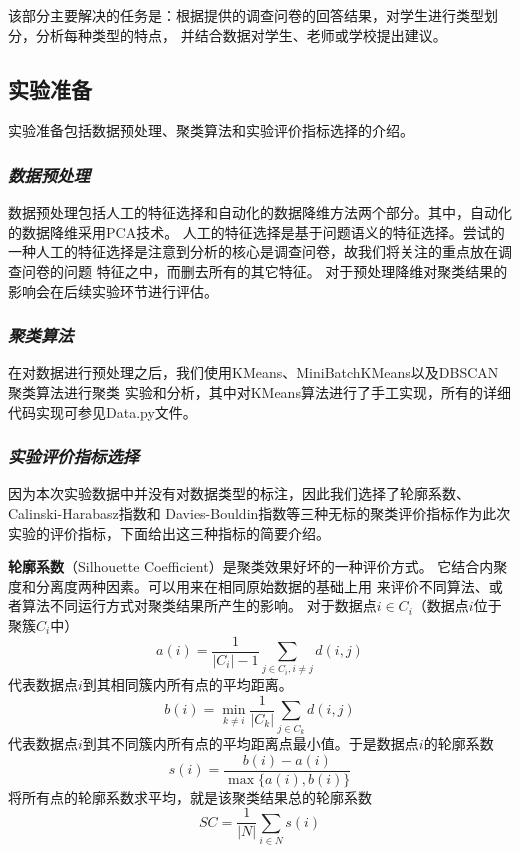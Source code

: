\documentclass{acm_proc_article-sp}
\begin{document}
该部分主要解决的任务是：根据提供的调查问卷的回答结果，对学生进行类型划分，分析每种类型的特点，
并结合数据对学生、老师或学校提出建议。

\subsection{\textsf{实验准备}}
实验准备包括数据预处理、聚类算法和实验评价指标选择的介绍。
\subsubsection{\textit{数据预处理}}

数据预处理包括人工的特征选择和自动化的数据降维方法两个部分。其中，自动化的数据降维采用PCA技术。
人工的特征选择是基于问题语义的特征选择。尝试的一种人工的特征选择是注意到分析的核心是调查问卷，故我们将关注的重点放在调查问卷的问题
特征之中，而删去所有的其它特征。
对于预处理降维对聚类结果的影响会在后续实验环节进行评估。


\subsubsection{\textit{聚类算法}}

在对数据进行预处理之后，我们使用KMeans、MiniBatchKMeans以及DBSCAN聚类算法进行聚类
实验和分析，其中对KMeans算法进行了手工实现，所有的详细代码实现可参见Data.py文件。

\subsubsection{\textit{实验评价指标选择}}

因为本次实验数据中并没有对数据类型的标注，因此我们选择了轮廓系数、Calinski-Harabasz指数和
Davies-Bouldin指数等三种无标的聚类评价指标作为此次实验的评价指标，下面给出这三种指标的简要介绍。

\textbf{轮廓系数}（Silhouette Coefficient）是聚类效果好坏的一种评价方式。
它结合内聚度和分离度两种因素。可以用来在相同原始数据的基础上用
来评价不同算法、或者算法不同运行方式对聚类结果所产生的影响。
对于数据点$i \in C_i$（数据点$i$位于聚簇$C_i$中）
$$a(i) = \frac{1}{|C_i| - 1} \sum_{j \in C_i, i \neq j} d(i, j)$$
代表数据点$i$到其相同簇内所有点的平均距离。
$$b(i) = \min_{k \neq i} \frac{1}{|C_k|} \sum_{j \in C_k} d(i, j)$$
代表数据点$i$到其不同簇内所有点的平均距离点最小值。于是数据点$i$的轮廓系数
$$s(i) = \frac{b(i) - a(i)}{\max\{a(i),b(i)\}}$$
将所有点的轮廓系数求平均，就是该聚类结果总的轮廓系数
$$\mathit{SC}=\frac{1}{|N|} \sum_{i\in N} s(i)$$
\end{document}
